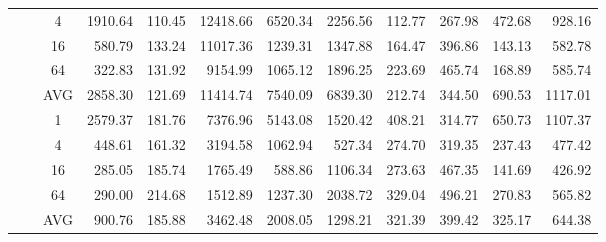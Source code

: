 \begin{table}[]
\begin{center}
{\begin{tabular}{|c|c|c|N{5}{1}N{5}{1}N{5}{1}N{5}{1}N{5}{1}N{5}{1}n{5}{1}n{5}{1}|n{5}{1}|}
 & & 4                                                 & 1910.64 & 110.45 & 12418.66 &  6520.34 &  2256.56 & 112.77 & 267.98 &  472.68 &  928.16  \\
 & & 16                                                &  580.79 & 133.24 & 11017.36 &  1239.31 &  1347.88 & 164.47 & 396.86 &  143.13 &  582.78  \\
 & & 64                                                &  322.83 & 131.92 &  9154.99 &  1065.12 &  1896.25 & 223.69 & 465.74 &  168.89 &  585.74  \\ 
 & & AVG                                               & 2858.30 & 121.69 & 11414.74 &  7540.09 &  6839.30 & 212.74 & 344.50 &  690.53 & {\boldmath}1117.01  \\ 
 &  & 1 & 2579.37 & 181.76 &  7376.96 &  5143.08 &  1520.42 & 408.21 & 314.77 &  650.73 & 1107.37 \\
 & & 4                            &  448.61 & 161.32 &  3194.58 &  1062.94 &   527.34 & 274.70 & 319.35 &  237.43 &  477.42 \\
 & & 16                           &  285.05 & 185.74 &  1765.49 &   588.86 &  1106.34 & 273.63 & 467.35 &  141.69 &  426.92 \\
 & & 64                           &  290.00 & 214.68 &  1512.89 &  1237.30 &  2038.72 & 329.04 & 496.21 &  270.83 &  565.82 \\ 
 & & AVG                          &  900.76 & 185.88 &  3462.48 &  2008.05 &  1298.21 & 321.39 & 399.42 &  325.17 &  {\boldmath}644.38 \\  \hline
\end{tabular}}
\npnoround
\end{center}
\end{table}

\fi
